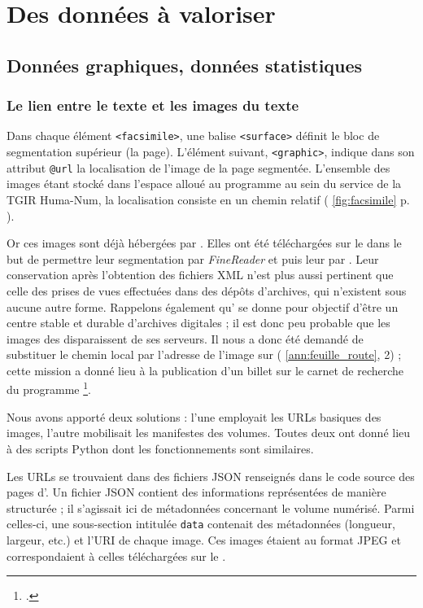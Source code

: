 \part{Des données à valoriser}

\clearpage
\thispagestyle{empty}
\cleardoublepage

\chapter{Données graphiques, données statistiques}

\section{Le lien entre le texte et les images du texte}

Dans chaque élément \texttt{<facsimile>}, une balise \texttt{<surface>} définit le bloc de segmentation supérieur (la page). L'élément suivant, \texttt{<graphic>}, indique dans son attribut \texttt{@url} la localisation de l'image de la page segmentée. L'ensemble des images étant stocké dans l'espace alloué au programme \timeus{} au sein du service \sharedocs{} de la TGIR Huma-Num, la localisation consiste en un chemin relatif (\fig{} \ref{fig:facsimile} p. \pageref{fig:facsimile}).

Or ces images sont déjà hébergées par \ia. Elles ont été téléchargées sur le \sharedocs{} dans le but de permettre leur segmentation par \textit{FineReader} et \transkribus{} puis leur \ocr{} par \lse. Leur conservation après l'obtention des fichiers XML n'est plus aussi pertinent que celle des prises de vues effectuées dans des dépôts d'archives, qui n'existent sous aucune autre forme. Rappelons également qu'\ia{} se donne pour objectif d’être un centre stable et durable d’archives digitales ; il est donc peu probable que les images des \odm{} disparaissent de ses serveurs. Il nous a donc été demandé de substituer le chemin local par l'adresse de l'image sur \ia{} (\ann{} \ref{ann:feuille_route}, \issue{} 2) ; cette mission a donné lieu à la publication d'un billet sur le carnet de recherche du programme \timeus\footcite{genero}.

Nous avons apporté deux solutions : l'une employait les URLs basiques des images, l'autre mobilisait les manifestes \iiif{} des volumes. Toutes deux ont donné lieu à des scripts Python dont les fonctionnements sont similaires.

Les URLs se trouvaient dans des fichiers JSON renseignés dans le code source des pages d'\ia. Un fichier JSON contient des informations représentées de manière structurée ; il s'agissait ici de métadonnées concernant le volume numérisé. Parmi celles-ci, une sous-section intitulée \texttt{data} contenait des métadonnées (longueur, largeur, etc.) et l'URI de chaque image. Ces images étaient au format JPEG et correspondaient à celles téléchargées sur le \sharedocs.

